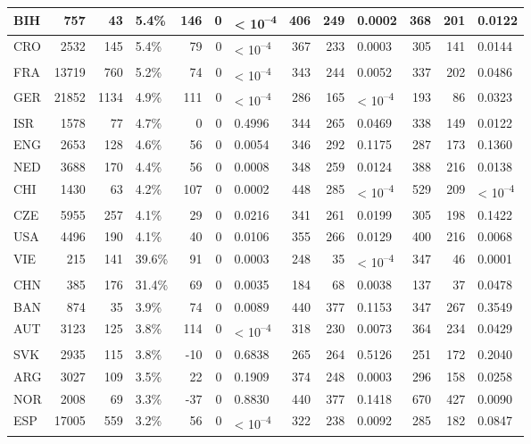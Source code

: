 \begin{tabular}{l|r|r|l|r|r|l|r|r|l|r|r|l}
\hline
BIH & 757 & 43 & 5.4\% & 146 & 0 & < 10\textsuperscript{--4} & 406 & 249 & 0.0002 & 368 & 201 & 0.0122\\
\hline
CRO & 2532 & 145 & 5.4\% & 79 & 0 & < 10\textsuperscript{--4} & 367 & 233 & 0.0003 & 305 & 141 & 0.0144\\
\hline
FRA & 13719 & 760 & 5.2\% & 74 & 0 & < 10\textsuperscript{--4} & 343 & 244 & 0.0052 & 337 & 202 & 0.0486\\
\hline
GER & 21852 & 1134 & 4.9\% & 111 & 0 & < 10\textsuperscript{--4} & 286 & 165 & < 10\textsuperscript{--4} & 193 & 86 & 0.0323\\
\hline
ISR & 1578 & 77 & 4.7\% & 0 & 0 & 0.4996 & 344 & 265 & 0.0469 & 338 & 149 & 0.0122\\
\hline
ENG & 2653 & 128 & 4.6\% & 56 & 0 & 0.0054 & 346 & 292 & 0.1175 & 287 & 173 & 0.1360\\
\hline
NED & 3688 & 170 & 4.4\% & 56 & 0 & 0.0008 & 348 & 259 & 0.0124 & 388 & 216 & 0.0138\\
\hline
CHI & 1430 & 63 & 4.2\% & 107 & 0 & 0.0002 & 448 & 285 & < 10\textsuperscript{--4} & 529 & 209 & < 10\textsuperscript{--4}\\
\hline
CZE & 5955 & 257 & 4.1\% & 29 & 0 & 0.0216 & 341 & 261 & 0.0199 & 305 & 198 & 0.1422\\
\hline
USA & 4496 & 190 & 4.1\% & 40 & 0 & 0.0106 & 355 & 266 & 0.0129 & 400 & 216 & 0.0068\\
\hline
VIE & 215 & 141 & 39.6\% & 91 & 0 & 0.0003 & 248 & 35 & < 10\textsuperscript{--4} & 347 & 46 & 0.0001\\
\hline
CHN & 385 & 176 & 31.4\% & 69 & 0 & 0.0035 & 184 & 68 & 0.0038 & 137 & 37 & 0.0478\\
\hline
BAN & 874 & 35 & 3.9\% & 74 & 0 & 0.0089 & 440 & 377 & 0.1153 & 347 & 267 & 0.3549\\
\hline
AUT & 3123 & 125 & 3.8\% & 114 & 0 & < 10\textsuperscript{--4} & 318 & 230 & 0.0073 & 364 & 234 & 0.0429\\
\hline
SVK & 2935 & 115 & 3.8\% & -10 & 0 & 0.6838 & 265 & 264 & 0.5126 & 251 & 172 & 0.2040\\
\hline
ARG & 3027 & 109 & 3.5\% & 22 & 0 & 0.1909 & 374 & 248 & 0.0003 & 296 & 158 & 0.0258\\
\hline
NOR & 2008 & 69 & 3.3\% & -37 & 0 & 0.8830 & 440 & 377 & 0.1418 & 670 & 427 & 0.0090\\
\hline
ESP & 17005 & 559 & 3.2\% & 56 & 0 & < 10\textsuperscript{--4} & 322 & 238 & 0.0092 & 285 & 182 & 0.0847\\
\hline

\end{tabular}
